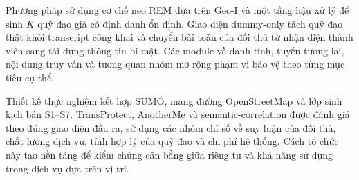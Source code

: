 \documentclass[12pt,a4paper,oneside]{report}
\begin{document}
Phương pháp sử dụng cơ chế neo REM dựa trên Geo-I và một tầng hậu xử lý để sinh $K$ quỹ đạo giả có định danh ổn định. Giao diện dummy-only tách quỹ đạo thật khỏi transcript công khai và chuyển bài toán của đối thủ từ nhận diện thành viên sang tái dựng thông tin bí mật. Các module về danh tính, tuyến tương lai, nội dung truy vấn và tương quan nhóm mở rộng phạm vi bảo vệ theo từng mục tiêu cụ thể.

Thiết kế thực nghiệm kết hợp SUMO, mạng đường OpenStreetMap và lớp sinh kịch bản S1--S7. TransProtect, AnotherMe và semantic-correlation được đánh giá theo đúng giao diện đầu ra, sử dụng các nhóm chỉ số về suy luận của đối thủ, chất lượng dịch vụ, tính hợp lý của quỹ đạo và chi phí hệ thống. Cách tổ chức này tạo nền tảng để kiểm chứng cân bằng giữa riêng tư và khả năng sử dụng trong dịch vụ dựa trên vị trí.
\end{document}
